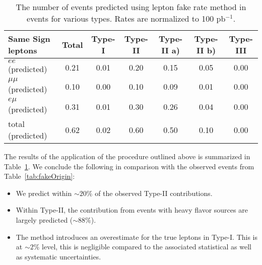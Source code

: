 \vspace{2mm}
\begin{table}[hbt]
\begin{center}
\begin{tabular}{|l|c|c|c|c|c|c|}\hline
Same Sign leptons & Total &      Type-I &  Type-II & Type-II a) & Type-II b) & Type-III \\ \hline
$ee$ (predicted) &	0.21 &	0.01 &	0.20 &	0.15 &	0.05 &	0.00 \\
$\mu\mu$ (predicted) &	0.10 &	0.00 &	0.10 &	0.09 &	0.01 &	0.00 \\
$e\mu$ (predicted) &	0.31 &	0.01 &	0.30 &	0.26 &	0.04 &	0.00 \\
total (predicted) &	0.62 &	0.02 &	0.60 &	0.50 &	0.10 &	0.00 \\
\hline
\end{tabular}
\caption{ The number of events predicted using lepton fake rate method in \ttbar events for various types. 
Rates are normalized to 100 pb$^{-1}$.\label{tab:LeptonFakePredict}}
\end{center}
\end{table}
 The results of the application of the procedure outlined above is summarized in Table~\ref{tab:LeptonFakePredict}. 
We conclude the following in comparison with the observed events from Table~\ref{tab:fakeOrigin}:


\begin{itemize}
\item We predict within $\sim 20 \%$ of the observed Type-II contributions.
\item Within Type-II, the contribution from events with heavy flavor sources are largely predicted ($\sim 88 \%$).
\item The method introduces an overestimate for the true leptons in Type-I. This is at $\sim 2 \%$ level, 
this is negligible compared to the associated statistical as well as systematic uncertainties.
\end{itemize}
